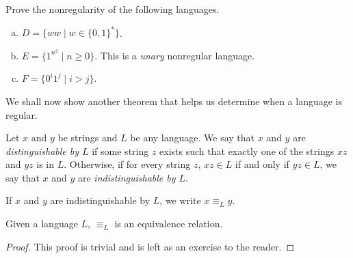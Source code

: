 \begin{exercise}
Prove the nonregularity of the following languages.
\begin{enumerate}[(a)]
	\item $D=\{ww\mid w\in\{0,1\}^*\}$.
	\item $E=\{1^{n^2}\mid n\geq 0\}$. This is a \textit{unary} nonregular language.
	\item $F=\{0^i1^j\mid i>j\}$.
\end{enumerate}
\end{exercise}

We shall now show another theorem that helps us determine when a language is regular.
\begin{definition}
Let $x$ and $y$ be strings and $L$ be any language. We say that $x$ and $y$ are \textit{distinguishable by $L$} if some string $z$ exists such that exactly one of the strings $xz$ and $yz$ is in $L$. Otherwise, if for every string $z$, $xz\in L$ if and only if $yz\in L$, we say that $x$ and $y$ are \textit{indistinguishable by $L$}.
\end{definition}

If $x$ and $y$ are indistinguishable by $L$, we write $x\equiv_Ly$.
\begin{lemma}
Given a language $L$, $\equiv_L$ is an equivalence relation.
\end{lemma}
\begin{proof}
This proof is trivial and is left as an exercise to the reader.
\end{proof}

